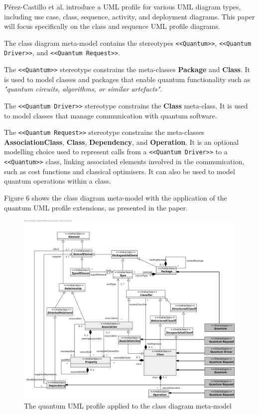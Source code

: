 \documentclass{article}
\newcounter{subsubsubsection}[subsubsection]
\begin{document}
Pérez-Castillo et al. introduce a UML profile for various UML diagram types, including use case, class, sequence, activity, and deployment diagrams. This paper will focus specifically on the class and sequence UML profile diagrams.


The class diagram meta-model contains the stereotypes \texttt{<<Quantum>>}, \texttt{<<Quantum Driver>>}, and \texttt{<<Quantum Request>>}.

The \texttt{<<Quantum>>} stereotype constrains the meta-classes \textbf{Package} and \textbf{Class}. It is used to model classes and packages that enable quantum functionality such as \textit{"quantum
circuits, algorithms, or similar artefacts"}\cite{Pérez-Castillo2022}.

The \texttt{<<Quantum Driver>>} stereotype constrains the \textbf{Class} meta-class. It is used to model classes that manage communication with quantum software\cite{Pérez-Castillo2022}. 

The \texttt{<<Quantum Request>>} stereotype constrains the meta-classes \textbf{AssociationClass}, \textbf{Class}, \textbf{Dependency}, and \textbf{Operation}. It is an optional modelling choice used to represent calls from a \texttt{<<Quantum Driver>>} to a \texttt{<<Quantum>>} class, linking associated elements involved in the communication, such as cost functions and classical optimisers. It can also be used to model quantum operations within a class\cite{Pérez-Castillo2022}.

Figure 6 shows the class diagram meta-model with the application of the quantum UML profile extensions, as presented in the paper.

\begin{figure}
    \centering
    \includegraphics[width=1\linewidth]{QuantumUMLProfile-ClassDiagram.png}
    \caption{The quantum UML profile applied to the class diagram meta-model\cite{PerezCastillo2021Git}}
    \label{fig:QUMLPD_CD}
\end{figure}
\end{document}
